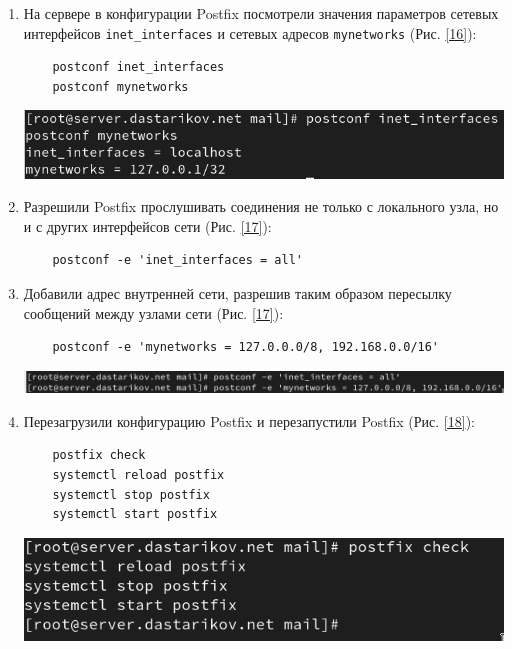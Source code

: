 \begin{enumerate}
\item На сервере в конфигурации Postfix посмотрели значения параметров сетевых интерфейсов \texttt{inet\_interfaces} и сетевых адресов \texttt{mynetworks} (Рис. \ref{16}):
  \begin{verbatim}
    postconf inet_interfaces
    postconf mynetworks
  \end{verbatim}
\begin{center}
    \centering
    \includegraphics[width=\textwidth]{../images/image16.png}
    \label{16}
\end{center}

\item Разрешили Postfix прослушивать соединения не только с локального узла, но и с других интерфейсов сети (Рис. \ref{17}):
  \begin{verbatim}
    postconf -e 'inet_interfaces = all'
  \end{verbatim}
\item Добавили адрес внутренней сети, разрешив таким образом пересылку сообщений между узлами сети (Рис. \ref{17}):
  \begin{verbatim}
    postconf -e 'mynetworks = 127.0.0.0/8, 192.168.0.0/16'
  \end{verbatim}
\begin{center}
    \centering
    \includegraphics[width=\textwidth]{../images/image17.png}
    \label{17}
\end{center}

\item Перезагрузили конфигурацию Postfix и перезапустили Postfix (Рис. \ref{18}):
  \begin{verbatim}
    postfix check
    systemctl reload postfix
    systemctl stop postfix
    systemctl start postfix
  \end{verbatim}
\begin{center}
    \centering
    \includegraphics[width=\textwidth]{../images/image18.png}
    \label{18}
\end{center}


\end{enumerate}
